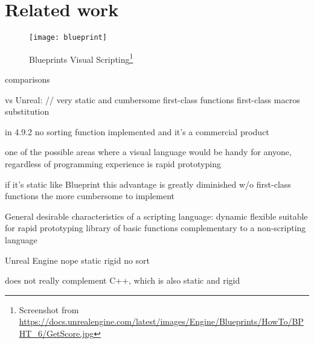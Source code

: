 \chapter{Related work}\label{chap:comparison}

\begin{figure}[h!]
\centering
\texttt{[image: blueprint]}
\caption{Blueprints Visual Scripting\footnote{Screenshot from  \url{https://docs.unrealengine.com/latest/images/Engine/Blueprints/HowTo/BPHT_6/GetScore.jpg}}}
\label{fig:blueprint}
\end{figure}

comparisons

vs Unreal: // very static and cumbersome
    first-class functions
    first-class macros
    substitution
    
    in 4.9.2 no sorting function implemented
        and it's a commercial product
        
        one of the possible areas where a visual language would be handy for anyone, regardless of programming experience is rapid prototyping
        
        if it's static like Blueprint this advantage is greatly diminished
    w/o first-class functions the more cumbersome to implement
    

General desirable characteristics of a scripting language:
	dynamic
	flexible
	suitable for rapid prototyping
	library of basic functions
	complementary to a non-scripting language
	
Unreal Engine
	nope
	static
	rigid
	no sort
	
	does not really complement C++, which is also static and rigid